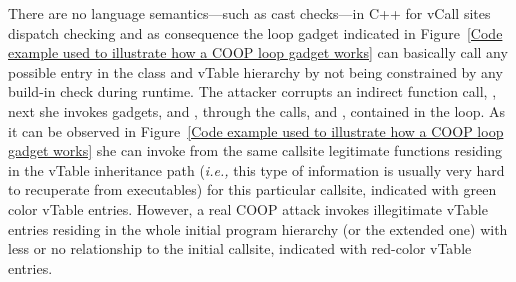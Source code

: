 There are no language semantics---such as cast checks---in C++ for vCall sites dispatch checking and as consequence
the loop gadget indicated in Figure~\ref{Code example used to illustrate how a COOP loop gadget works}
can basically call any possible entry in the class and vTable hierarchy by not being constrained by any build-in check during
runtime. The attacker corrupts an indirect function call, , 
next she invokes gadgets,   and , 
through the calls,  and , contained in the loop. 
As it can be observed in Figure~\ref{Code example used to illustrate how a COOP loop gadget works} she 
can invoke from the same callsite legitimate functions residing in the vTable inheritance path
(\textit{i.e.,} this type of information is usually very hard to recuperate from executables)
for this particular callsite, indicated with green color vTable entries. 
However, a real COOP attack invokes illegitimate
vTable entries residing in the whole initial program hierarchy (or the extended one)
with less or no relationship to the initial callsite,
indicated with red-color vTable entries.

